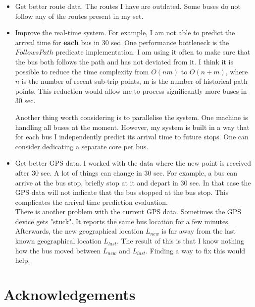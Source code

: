 \documentclass[12pt,a4paper,oneside,openright]{report}
\begin{document}
\begin{itemize}

\item  Get better route data. The routes I have are outdated. Some buses do not follow any
       of the routes present in my set.

\item  Improve the real-time system. For example, I am not able to
       predict the arrival time for \textbf{each} bus in 30 sec. 
       One performance bottleneck is the $FollowsPath$ predicate implementation.
       I am using it often to make sure that the bus both follows the path and has not deviated
       from it. I think it is possible to reduce the time complexity from $O(nm)$ to $O(n + m)$,
       where $n$ is the number of recent sub-trip points, m is the number of historical path points.
       This reduction would allow me to process significantly more buses in 30 sec.

       Another thing worth considering is to parallelise the system. One machine is handling all buses
       at the moment. However, my system is built in
       a way that for each bus I independently predict its arrival time to future stops.
       One can consider dedicating a separate core per bus.

\item  Get better GPS data. I worked with the data where the new point is received after
       30 sec. A lot of things can change in 30 sec. For example, a bus can arrive at the bus
       stop, briefly stop at it and depart in 30 sec. In that case the GPS data will not
       indicate that the bus stopped at the bus stop. This complicates the arrival time
       prediction evaluation. \\

       There is another problem with the current GPS data. Sometimes the GPS device gets
       "stuck". It reports the same bus location for a few minutes. Afterwards, the new geographical
       location $L_{new}$ is far away from the last known geographical location $L_{last}$.
       The result of this is that I know nothing how the bus moved between $L_{new}$ and $L_{last}$.
       Finding a way to fix this would help.


\end{itemize}

\section{Acknowledgements}
\end{document}
